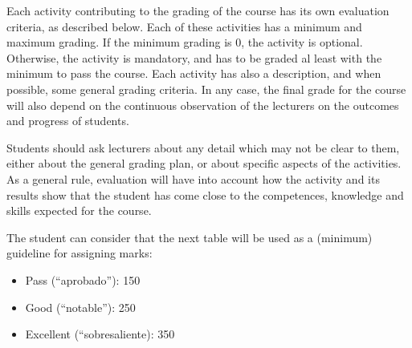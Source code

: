 \documentclass[a4paper]{article}
\begin{document}
Each activity contributing to the grading of the course has its own evaluation criteria, as described below. Each of these activities has a minimum and maximum grading. If the minimum grading is 0, the activity is optional. Otherwise, the activity is mandatory, and has to be graded al least with the minimum to pass the course. Each activity has also a description, and when possible, some general grading criteria. In any case, the final grade for the course will also depend on the continuous observation of the lecturers on the outcomes and progress of students.

Students should ask lecturers about any detail which may not be clear to them, either about the general grading plan, or about specific aspects of the activities. As a general rule, evaluation will have into account how the activity and its results show that the student has come close to the competences, knowledge and skills expected for the course.

The student can consider that the next table will be used as a (minimum) guideline for assigning marks:

\begin{itemize}
\item Pass (``aprobado''): 150
\item Good (``notable''): 250
\item Excellent (``sobresaliente): 350
\end{itemize}
\end{document}

